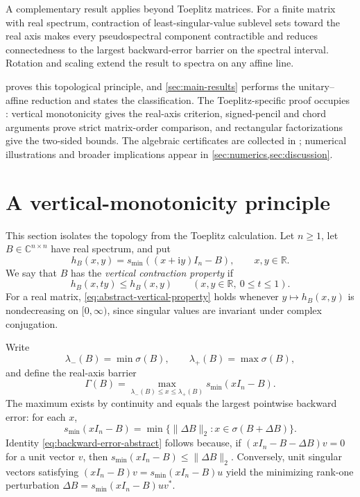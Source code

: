 \documentclass[10pt,twoside]{siamart1116}
\numberwithin{equation}{section}
\newcommand{\C}{\mathbb C}
\newcommand{\R}{\mathbb R}
\newcommand{\ii}{\mathrm i}
\begin{document}
A complementary result applies beyond Toeplitz matrices.  For a finite matrix
with real spectrum, contraction of least-singular-value sublevel sets toward
the real axis makes every pseudospectral component contractible and reduces
connectedness to the largest backward-error barrier on the spectral interval.
Rotation and scaling extend the result to spectra on any affine line.

 proves this topological principle, and
\cref{sec:main-results} performs the unitary--affine reduction and states the
classification.  The Toeplitz-specific proof occupies
: vertical monotonicity gives the
real-axis criterion, signed-pencil and chord arguments prove strict
matrix-order comparison, and rectangular factorizations give the two-sided
bounds.  The algebraic certificates are collected in
; numerical
illustrations and broader implications appear in
\cref{sec:numerics,sec:discussion}.

\section{A vertical-monotonicity principle}
\label{sec:topological-reduction}

This section isolates the topology from the Toeplitz calculation.  Let
\(n\geq1\), let \(B\in\C^{n\times n}\) have real spectrum, and put
\[
 h_B(x,y)=s_{\min}((x+\ii y)I_n-B),\qquad x,y\in\R.
\]
We say that \(B\) has the \emph{vertical contraction property} if
\begin{equation}\label{eq:abstract-vertical-property}
 h_B(x,ty)\leq h_B(x,y)
 \qquad(x,y\in\R,\ 0\leq t\leq1).
\end{equation}
For a real matrix, \eqref{eq:abstract-vertical-property} holds whenever
\(y\mapsto h_B(x,y)\) is nondecreasing on \([0,\infty)\), since singular
values are invariant under complex conjugation.

Write
\[
 \lambda_-(B)=\min\sigma(B),\qquad
 \lambda_+(B)=\max\sigma(B),
\]
and define the real-axis barrier
\begin{equation}\label{eq:abstract-barrier}
 \Gamma(B)=\max_{\lambda_-(B)\leq x\leq\lambda_+(B)}
 s_{\min}(xI_n-B).
\end{equation}
The maximum exists by continuity and equals the largest pointwise backward
error: for each \(x\),
\begin{equation}\label{eq:backward-error-abstract}
 s_{\min}(xI_n-B)=
 \min\{\lVert\Delta B\rVert_2:x\in\sigma(B+\Delta B)\}.
\end{equation}
Identity \eqref{eq:backward-error-abstract} follows because, if
\((xI_n-B-\Delta B)v=0\) for a unit vector \(v\), then
\(s_{\min}(xI_n-B)\leq\lVert\Delta B\rVert_2\).  Conversely, unit singular
vectors satisfying \((xI_n-B)v=s_{\min}(xI_n-B)u\) yield the minimizing
rank-one perturbation \(\Delta B=s_{\min}(xI_n-B)uv^*\).
\end{document}
